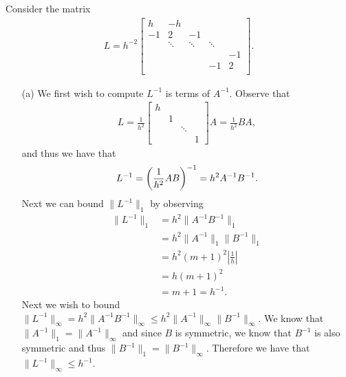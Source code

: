 \documentclass[12pt]{report}
\begin{document}
\begin{solution}
  
    \noindent
    Consider the matrix
    \begin{align*}
      L = h^{-2} 
      \begin{bmatrix} 
        h & -h \\ -1 & 2 &-1 \\  
        & \ddots & \ddots & \ddots \\
        &&&& -1\\
        &&&-1& 2\\
  \end{bmatrix}.\end{align*}
  \begin{enumerate}
    \item [(a)]
      We first wish to compute $L^{-1}$ is terms of $A^{-1}$. Observe that 
      \begin{align*}
        L = \frac{1}{h^2} \begin{bmatrix}
          h\\
          &1\\
          &&\ddots\\
          &&&1
        \end{bmatrix} A = \frac{1}{h^2}BA,
      \end{align*}
      and thus we have that
      \begin{align*}
        L^{-1} = {\left(\frac{1}{h^2}AB\right)}^{-1} = h^2A^{-1}B^{-1}.
      \end{align*}
      Next we can bound $\|L^{-1}\|_1$ by observing 
      \begin{align*}
        \| L^{-1} \|_1 &= h^2 \|A^{-1}B^{-1}\|_1\\
          &= h^2\|A^{-1}\|_1\|B^{-1}\|_1\\
          &= h^2 (m+1)^2 \left|\frac{1}{h}\right|\\
          &= h(m+1)^2\\
          &= m+1 = h^{-1}.
      \end{align*}
      Next we wish to bound $\|L^{-1}\|_\infty = h^2 \|A^{-1}B^{-1}\|_\infty \leq h^2\|A^{-1}\|_\infty\|B^{-1}\|_\infty$. We know that $\|A^{-1}\|_1 = \|A^{-1}\|_\infty$ and since $B$ is symmetric, we know that $B^{-1}$ is also symmetric and thus $\|B^{-1}\|_1 = \|B^{-1}\|_\infty$. Therefore we have that $\|L^{-1}\|_\infty \leq h^{-1}$.




\end{enumerate}
\end{solution}
\end{document}
